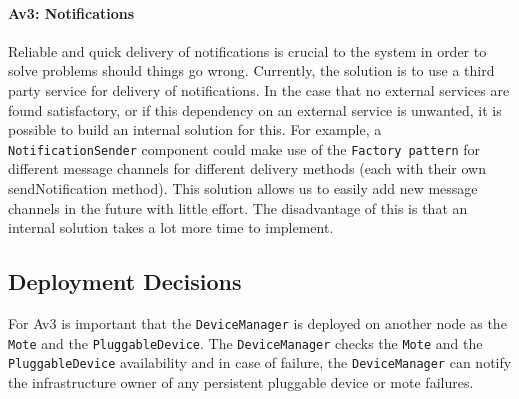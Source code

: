         \paragraph{Av3: Notifications}
            Reliable and quick delivery of notifications is crucial to the
            system in order to solve problems should things go wrong. Currently,
            the solution is to use a third party service for delivery of
            notifications. In the case that no external services are found
            satisfactory, or if this dependency on an external service is
            unwanted, it is possible to build an internal solution for this.
            For example, a \texttt{NotificationSender} component could make use
            of the \texttt{Factory pattern} for different message channels for
            different delivery methods (each with their own sendNotification method).
            This solution allows us to easily add new message channels in the
            future with little effort. The disadvantage of this is that an
            internal solution takes a lot more time to implement.


    \subsection*{Deployment Decisions}
        For Av3 is important that the \texttt{DeviceManager} is deployed on another node as the
        \texttt{Mote} and the \texttt{PluggableDevice}. The \texttt{DeviceManager} 
        checks the \texttt{Mote} and the \texttt{PluggableDevice} availability and in case of failure, the \texttt{DeviceManager}
        can notify the infrastructure owner of any persistent pluggable device or mote failures.\\        

